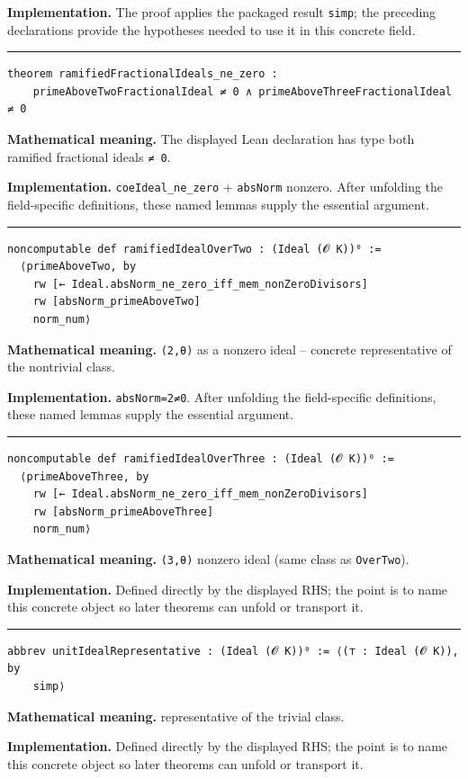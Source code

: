 \documentclass[UTF8,a4paper,11pt,fontset=fandol]{ctexart}
\theoremstyle{definition}
\newcommand{\statementsep}{\par\medskip\hrule\medskip}
\begin{document}
\noindent\textbf{Implementation.} The proof applies the packaged result \texttt{simp}; the preceding declarations provide the hypotheses needed to use it in this concrete field.\par
\statementsep
\begin{verbatim}
theorem ramifiedFractionalIdeals_ne_zero :
    primeAboveTwoFractionalIdeal ≠ 0 ∧ primeAboveThreeFractionalIdeal ≠ 0
\end{verbatim}
\noindent\textbf{Mathematical meaning.} The displayed Lean declaration has type both ramified fractional ideals \texttt{≠ 0}.\par
\noindent\textbf{Implementation.} \texttt{coeIdeal\_\allowbreak{}ne\_\allowbreak{}zero} + \texttt{absNorm} nonzero. After unfolding the field-specific definitions, these named lemmas supply the essential argument.\par
\statementsep
\begin{verbatim}
noncomputable def ramifiedIdealOverTwo : (Ideal (𝓞 K))⁰ :=
  ⟨primeAboveTwo, by
    rw [← Ideal.absNorm_ne_zero_iff_mem_nonZeroDivisors]
    rw [absNorm_primeAboveTwo]
    norm_num⟩
\end{verbatim}
\noindent\textbf{Mathematical meaning.} \texttt{(2,θ)} as a nonzero ideal -- concrete representative of the nontrivial class.\par
\noindent\textbf{Implementation.} \texttt{absNorm=2≠0}. After unfolding the field-specific definitions, these named lemmas supply the essential argument.\par
\statementsep
\begin{verbatim}
noncomputable def ramifiedIdealOverThree : (Ideal (𝓞 K))⁰ :=
  ⟨primeAboveThree, by
    rw [← Ideal.absNorm_ne_zero_iff_mem_nonZeroDivisors]
    rw [absNorm_primeAboveThree]
    norm_num⟩
\end{verbatim}
\noindent\textbf{Mathematical meaning.} \texttt{(3,θ)} nonzero ideal (same class as \texttt{OverTwo}).\par
\noindent\textbf{Implementation.} Defined directly by the displayed RHS; the point is to name this concrete object so later theorems can unfold or transport it.\par
\statementsep
\begin{verbatim}
abbrev unitIdealRepresentative : (Ideal (𝓞 K))⁰ := ⟨(⊤ : Ideal (𝓞 K)), by
    simp⟩
\end{verbatim}
\noindent\textbf{Mathematical meaning.} representative of the trivial class.\par
\noindent\textbf{Implementation.} Defined directly by the displayed RHS; the point is to name this concrete object so later theorems can unfold or transport it.\par
\end{document}
